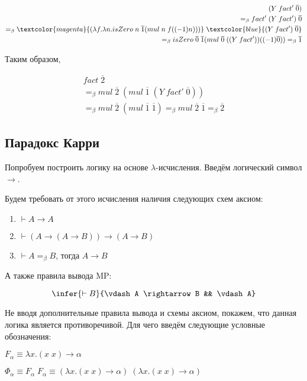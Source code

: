 \begin{align*}
	(Y \; fact' \; \overline{0}) \\ =_{\beta} fact' \; (Y \; fact') \; \overline{0} \\ =_{\beta} \textcolor{magenta}{(\lambda f. \lambda n. isZero\; n \; \overline{1} (mul \; n \; f((-1) n)))} \; \textcolor{blue}{(Y \; fact') \; \overline{0}} \\ =_{\beta}  isZero\; \overline{0} \; \overline{1} (mul \; \overline{0} \; ((Y \; fact'))((-1) \overline{0})) =_{\beta} \overline{1}
\end{align*}

Таким образом,

\begin{align*}
	fact \; \overline{2} \\ =_{\beta} mul \; \overline{2} \; (mul \; \overline{1} \; (Y \; fact' \; \overline{0})) \\=_{\beta} mul \; \overline{2} \; (mul \; \overline{1} \; \overline{1}) =_{\beta} mul \; \overline{2} \; \overline{1} =_{\beta} \overline{2}
\end{align*}

\subsection{Парадокс Карри}

Попробуем построить логику на основе $\lambda$-исчисления. Введём логический символ $\rightarrow$. 

Будем требовать от этого исчисления наличия следующих схем аксиом:

\begin{enumerate}
	\item $\vdash A \rightarrow A$
	\item $\vdash (A \rightarrow (A \rightarrow B)) \rightarrow (A \rightarrow B)$
	\item $\vdash A =_{\beta} B$, тогда $A \rightarrow B$
\end{enumerate}

А также правила вывода MP:

$$\infer{\vdash B}{\vdash A \rightarrow B && \vdash A}$$

Не вводя дополнительные правила вывода и схемы аксиом, покажем, что данная логика является противоречивой. Для чего введём следующие условные обозначения:

$F_{\alpha} \equiv \lambda x. (x \; x) \rightarrow \alpha$

$\Phi_{\alpha} \equiv F_{\alpha}  \; F_{\alpha}  \equiv (\lambda x. (x \; x) \rightarrow \alpha) \; (\lambda x. (x \; x) \rightarrow \alpha)$

